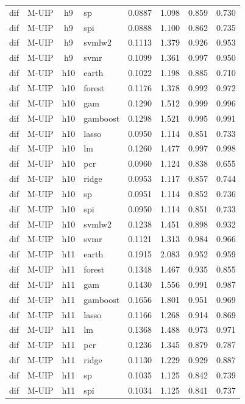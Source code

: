 \begin{ThreePartTable}
\begin{longtable}[t]{llclcccc}
dif & M-UIP & h9 & sp & 0.0887 & 1.098 & 0.859 & 0.730\\
dif & M-UIP & h9 & spi & 0.0888 & 1.100 & 0.862 & 0.735\\
dif & M-UIP & h9 & svmlw2 & 0.1113 & 1.379 & 0.926 & 0.953\\
dif & M-UIP & h9 & svmr & 0.1099 & 1.361 & 0.997 & 0.950\\
\addlinespace
dif & M-UIP & h10 & earth & 0.1022 & 1.198 & 0.885 & 0.710\\
dif & M-UIP & h10 & forest & 0.1176 & 1.378 & 0.992 & 0.972\\
dif & M-UIP & h10 & gam & 0.1290 & 1.512 & 0.999 & 0.996\\
dif & M-UIP & h10 & gamboost & 0.1298 & 1.521 & 0.995 & 0.991\\
dif & M-UIP & h10 & lasso & 0.0950 & 1.114 & 0.851 & 0.733\\
dif & M-UIP & h10 & lm & 0.1260 & 1.477 & 0.997 & 0.998\\
dif & M-UIP & h10 & pcr & 0.0960 & 1.124 & 0.838 & 0.655\\
dif & M-UIP & h10 & ridge & 0.0953 & 1.117 & 0.857 & 0.744\\
dif & M-UIP & h10 & sp & 0.0951 & 1.114 & 0.852 & 0.736\\
dif & M-UIP & h10 & spi & 0.0950 & 1.114 & 0.851 & 0.733\\
dif & M-UIP & h10 & svmlw2 & 0.1238 & 1.451 & 0.898 & 0.932\\
dif & M-UIP & h10 & svmr & 0.1121 & 1.313 & 0.984 & 0.966\\
\addlinespace
dif & M-UIP & h11 & earth & 0.1915 & 2.083 & 0.952 & 0.959\\
dif & M-UIP & h11 & forest & 0.1348 & 1.467 & 0.935 & 0.855\\
dif & M-UIP & h11 & gam & 0.1430 & 1.556 & 0.991 & 0.987\\
dif & M-UIP & h11 & gamboost & 0.1656 & 1.801 & 0.951 & 0.969\\
dif & M-UIP & h11 & lasso & 0.1166 & 1.268 & 0.914 & 0.869\\
dif & M-UIP & h11 & lm & 0.1368 & 1.488 & 0.973 & 0.971\\
dif & M-UIP & h11 & pcr & 0.1236 & 1.345 & 0.879 & 0.787\\
dif & M-UIP & h11 & ridge & 0.1130 & 1.229 & 0.929 & 0.887\\
dif & M-UIP & h11 & sp & 0.1035 & 1.125 & 0.842 & 0.739\\
dif & M-UIP & h11 & spi & 0.1034 & 1.125 & 0.841 & 0.737\\

\end{longtable}
\end{ThreePartTable}
